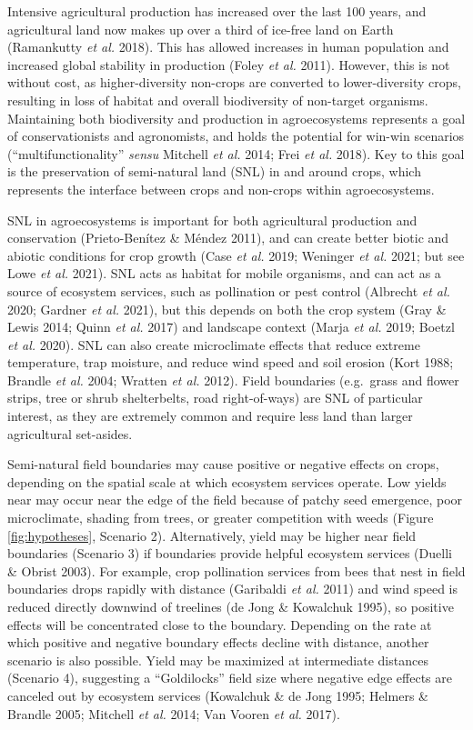 \documentclass[]{elsarticle} %
\begin{document}
Intensive agricultural production has increased over the last 100 years, and agricultural land now makes up over a third of ice-free land on Earth (Ramankutty \emph{et al.} 2018).
This has allowed increases in human population and increased global stability in production (Foley \emph{et al.} 2011).
However, this is not without cost, as higher-diversity non-crops are converted to lower-diversity crops, resulting in loss of habitat and overall biodiversity of non-target organisms.
Maintaining both biodiversity and production in agroecosystems represents a goal of conservationists and agronomists, and holds the potential for win-win scenarios ({``multifunctionality''} \emph{sensu} Mitchell \emph{et al.} 2014; Frei \emph{et al.} 2018).
Key to this goal is the preservation of semi-natural land (SNL) in and around crops, which represents the interface between crops and non-crops within agroecosystems.

SNL in agroecosystems is important for both agricultural production and conservation (Prieto-Benítez \& Méndez 2011), and can create better biotic and abiotic conditions for crop growth (Case \emph{et al.} 2019; Weninger \emph{et al.} 2021; but see Lowe \emph{et al.} 2021).
SNL acts as habitat for mobile organisms, and can act as a source of ecosystem services, such as pollination or pest control (Albrecht \emph{et al.} 2020; Gardner \emph{et al.} 2021), but this depends on both the crop system (Gray \& Lewis 2014; Quinn \emph{et al.} 2017) and landscape context (Marja \emph{et al.} 2019; Boetzl \emph{et al.} 2020).
SNL can also create microclimate effects that reduce extreme temperature, trap moisture, and reduce wind speed and soil erosion (Kort 1988; Brandle \emph{et al.} 2004; Wratten \emph{et al.} 2012).
Field boundaries (e.g.~grass and flower strips, tree or shrub shelterbelts, road right-of-ways) are SNL of particular interest, as they are extremely common and require less land than larger agricultural set-asides.

Semi-natural field boundaries may cause positive or negative effects on crops, depending on the spatial scale at which ecosystem services operate.
Low yields near may occur near the edge of the field because of patchy seed emergence, poor microclimate, shading from trees, or greater competition with weeds (Figure \ref{fig:hypotheses}, Scenario 2).
Alternatively, yield may be higher near field boundaries (Scenario 3) if boundaries provide helpful ecosystem services (Duelli \& Obrist 2003).
For example, crop pollination services from bees that nest in field boundaries drops rapidly with distance (Garibaldi \emph{et al.} 2011) and wind speed is reduced directly downwind of treelines (de Jong \& Kowalchuk 1995), so positive effects will be concentrated close to the boundary.
Depending on the rate at which positive and negative boundary effects decline with distance, another scenario is also possible.
Yield may be maximized at intermediate distances (Scenario 4), suggesting a ``Goldilocks'' field size where negative edge effects are canceled out by ecosystem services (Kowalchuk \& de Jong 1995; Helmers \& Brandle 2005; Mitchell \emph{et al.} 2014; Van Vooren \emph{et al.} 2017).
\end{document}
